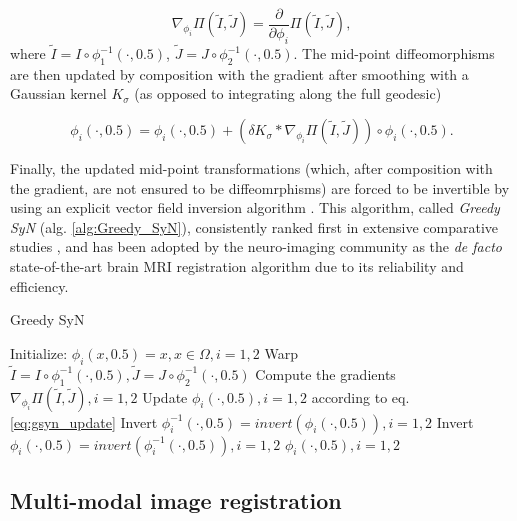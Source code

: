\begin{equation}\label{eq:grad_metric}
    \nabla_{\phi_{i}} \Pi(\tilde{I}, \tilde{J}) = \frac{\partial}{\partial \phi_{i}} \Pi \left( \tilde{I}, \tilde{J}\right),
\end{equation}
where $\tilde{I} = I \circ \phi_{1}^{-1}(\cdot, 0.5)$, $\tilde{J} = J \circ \phi_{2}^{-1}(\cdot, 0.5)$. The mid-point diffeomorphisms are then updated by composition with
the gradient after smoothing with a Gaussian kernel $K_{\sigma}$ (as opposed to integrating along the full geodesic)

\begin{equation}\label{eq:gsyn_update}
    \phi_{i}(\cdot, 0.5) = \phi_{i}(\cdot, 0.5) + \left( \delta K_{\sigma} \ast \nabla_{\phi_{i}} \Pi(\tilde{I}, \tilde{J}) \right) \circ \phi_{i}(\cdot, 0.5).
\end{equation}

Finally, the updated mid-point transformations (which, after composition with the gradient, are not ensured to be diffeomrphisms) are forced to be invertible by using an
explicit vector field inversion algorithm \cite{Chen2008}. This algorithm, called \textit{Greedy SyN} (alg. \ref{alg:Greedy_SyN}), consistently ranked first in extensive comparative
studies \cite{Klein2009}\cite{Klein2010}\cite{Rohlfing2012}, and has been adopted by the neuro-imaging community as the \textit{de facto} state-of-the-art brain
MRI registration algorithm due to its reliability and efficiency.

\begin{algorithm}[h!]
\caption{Greedy SyN}\label{alg:Greedy_SyN}
\begin{algorithmic}[1]
\STATE Initialize: $\phi_{i}(x, 0.5) = x,  x\in\Omega, i=1, 2$
\REPEAT
    \STATE Warp $\tilde{I}  = I \circ \phi_{1}^{-1}(\cdot, 0.5), \tilde{J} = J \circ \phi_{2}^{-1}(\cdot, 0.5)$
    \STATE Compute the gradients $\nabla_{\phi_{i}} \Pi(\tilde{I}, \tilde{J}), i=1,2$
    \STATE Update $\phi_{i}(\cdot, 0.5), i=1, 2$ according to eq. \ref{eq:gsyn_update}
    \STATE Invert $\phi_{i}^{-1}(\cdot, 0.5) = invert (\phi_{i}(\cdot, 0.5)), i=1, 2$
    \STATE Invert $\phi_{i}(\cdot, 0.5) = invert (\phi_{i}^{-1}(\cdot, 0.5)), i=1, 2$
\RETURN $\phi_{i}(\cdot, 0.5), i=1,2$
\end{algorithmic}
\end{algorithm}

\subsection{Multi-modal image registration}

